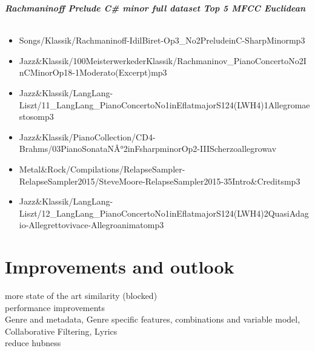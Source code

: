 \textit{\textbf{Rachmaninoff Prelude C\# minor full dataset Top 5 MFCC Euclidean\\}}
\\
\begin{itemize}
\item Songs/Klassik/Rachmaninoff-IdilBiret-Op3\_No2PreludeinC-SharpMinormp3
\item Jazz\&Klassik/100MeisterwerkederKlassik/Rachmaninov\_PianoConcertoNo2InCMinorOp18-1Moderato(Excerpt)mp3
\item Jazz\&Klassik/LangLang-Liszt/11\_LangLang\_PianoConcertoNo1inEflatmajorS124(LWH4)1Allegromaestosomp3
\item Jazz\&Klassik/PianoCollection/CD4-Brahms/03PianoSonataNÂ°2inFsharpminorOp2-IIIScherzoallegrowav
\item Metal\&Rock/Compilations/RelapseSampler-RelapseSampler2015/SteveMoore-RelapseSampler2015-35Intro\&Creditsmp3
\item Jazz\&Klassik/LangLang-Liszt/12\_LangLang\_PianoConcertoNo1inEflatmajorS124(LWH4)2QuasiAdagio-Allegrettovivace-Allegroanimatomp3
\end{itemize}

\section{Improvements and outlook}

more state of the art similarity (blocked)\\
performance improvements\\
Genre and metadata, Genre specific features, combinations and variable model, Collaborative Filtering, Lyrics\\
reduce hubness\\

